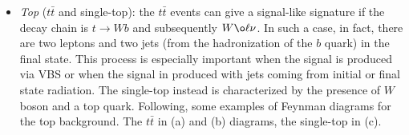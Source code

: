 \begin{itemize}
\item \textit{Top} ($t\bar{t}$ and single-top): the $t\bar{t}$ events can give a signal-like signature if the decay chain is $t \to Wb$ and subsequently $W \o \ell \nu$.  In such a case, in fact, there are two leptons and two jets (from the hadronization of the $b$ quark) in the final state. This process is especially important when the signal is produced via VBS or when the signal in produced with jets coming from initial or final state radiation. The single-top instead is characterized by the presence of $W$ boson and a top quark. Following, some examples of Feynman diagrams for the top background. The $t\bar{t}$ in (a) and (b) diagrams, the single-top in (c).
\begin{figure}
\centering%
 \qquad 
{} \qquad 

\end{figure}
\end{itemize}
